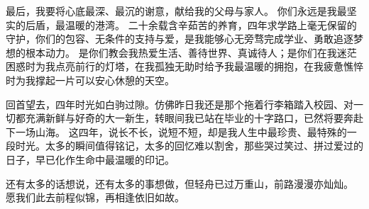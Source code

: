最后，我要将心底最深、最沉的谢意，献给我的父母与家人。
你们永远是我最坚实的后盾，最温暖的港湾。
二十余载含辛茹苦的养育，四年求学路上毫无保留的守护，你们的包容、无条件的支持与爱，是我能够心无旁骛完成学业、勇敢追逐梦想的根本动力。
是你们教会我热爱生活、善待世界、真诚待人；是你们在我迷茫困惑时为我点亮前行的灯塔，在我孤独无助时给予我最温暖的拥抱，在我疲惫憔悴时为我撑起一片可以安心休憩的天空。

回首望去，四年时光如白驹过隙。仿佛昨日我还是那个拖着行李箱踏入校园、对一切都充满新鲜与好奇的大一新生，转眼间我已站在毕业的十字路口，已然将要奔赴下一场山海。
这四年，说长不长，说短不短，却是我人生中最珍贵、最特殊的一段时光。太多的瞬间值得铭记，太多的回忆难以割舍，那些哭过笑过、拼过爱过的日子，早已化作生命中最温暖的印记。

还有太多的话想说，还有太多的事想做，但轻舟已过万重山，前路漫漫亦灿灿。
愿我们此去前程似锦，再相逢依旧如故。